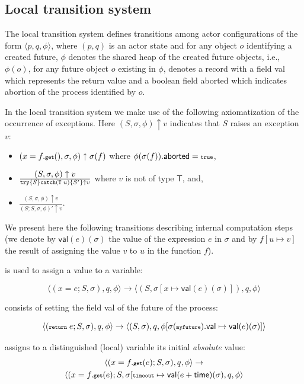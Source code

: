 \subsection{Local transition system}
The local transition system defines transitions among actor configurations of the form $\langle p,q,\phi\rangle $,
where $(p,q)$ is an actor state and for any object $o$ identifying a created future,  $\phi$ denotes the shared heap
of the created future objects, i.e., $\phi(o)$, for any future object $o$ existing in $\phi$,  denotes a record with a field
\textsf{val} which represents the return value  and a boolean field \textsf{aborted} which indicates abortion of the process
identified by $o$.

In the local  transition system we make use of the following axiomatization of the occurrence of exceptions.
Here $(S,\sigma,\phi)\uparrow v$ indicates that $S$  raises an exception $v$:
\begin{itemize}\itemsep5pt
 \item $ (x=f.{\textnormal{\textbf{{\scriptsize\texttt{get}}}}}(),\sigma,\phi) \uparrow \sigma(f)$ where $\phi(\sigma(f)).\mathsf{aborted}={\scriptsize\texttt{true}}$,
 \item $\frac{\displaystyle (S,\sigma,\phi)\uparrow v}{{\scriptsize\texttt{try}}\{ S \}{\scriptsize\texttt{catch}}({\scriptsize\texttt{T}} \; u)\{S'\}\uparrow v}$ where $v$ is not of type $\mathsf{T}$, and, 
 \item $\frac{\displaystyle (S,\sigma,\phi)\uparrow v}{\displaystyle (S;S,\sigma,\phi) '\uparrow v}$.
\end{itemize}

We present here the following transitions describing internal computation steps
(we denote by $ \textsf{val}(e)(\sigma)$ the value of the expression $e$ in $\sigma$
and by $f[u\mapsto v]$ the result of assigning the value $v$ to $u$ in the function $f$).

 is used to assign a value to a variable:

$$ \langle (x=e; S, \sigma), q, \phi\rangle \rightarrow \langle (S, \sigma [x \mapsto \textsf{val}(e)(\sigma)]), q, \phi\rangle $$

 consists of setting the field 
\textsf{val} of the future of the process:

$$
\langle (\textbf{{\scriptsize\texttt{return}}}\; e ;S , \sigma), q, \phi\rangle \rightarrow 
\langle (S, \sigma), q, \phi[\sigma({\scriptsize\texttt{myfuture}}).\textsf{val} \mapsto 
\textsf{val}(e)(\sigma)]\rangle
$$

assigns to a  distinguished (local) variable  its initial \emph{absolute} value:
\begin{multline*} \langle  (x=f.{\textnormal{\textbf{{\scriptsize\texttt{get}}}}}(e); S, \sigma), q, \phi\rangle \rightarrow  \\
 \langle (x=f.{\textnormal{\textbf{{\scriptsize\texttt{get}}}}}(e);S, \sigma [{\scriptsize\texttt{timeout}} \mapsto \textsf{val}(e+\mathsf{time})(\sigma), q, \phi\rangle 
\end{multline*}


